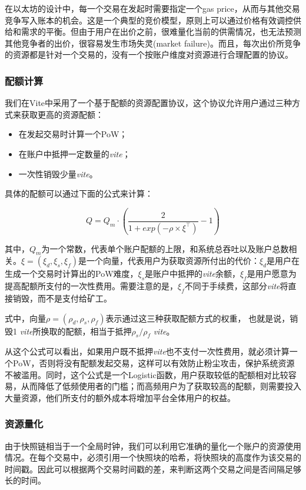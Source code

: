 \documentclass[UTF8,nofonts]{ctexart}
\begin{document}
\begin{multicols}{2}
在以太坊的设计中，每一个交易在发起时需要指定一个gas price，从而与其他交易竞争写入账本的机会。这是一个典型的竞价模型，原则上可以通过价格有效调控供给和需求的平衡。但由于用户在出价之前，很难量化当前的供需情况，也无法预测其他竞争者的出价，很容易发生市场失灵(market failure)。而且，每次出价所竞争的资源都是针对一个交易的，没有一个按账户维度对资源进行合理配置的协议。

\subsubsection{配额计算}
我们在Vite中采用了一个基于配额的资源配置协议，这个协议允许用户通过三种方式来获取更高的资源配额：
\begin{itemize}
\item 在发起交易时计算一个PoW；
\item 在账户中抵押一定数量的\textit{vite}；
\item 一次性销毁少量\textit{vite}。
\end{itemize}

具体的配额可以通过下面的公式来计算：

\begin{equation}
Q = Q_{m} \cdot \left ( \frac{2}{1+exp\left ( -\rho \times \xi^{\top} \right )} - 1  \right )
\end{equation}

其中，$Q_{m}$为一个常数，代表单个账户配额的上限，和系统总吞吐以及账户总数相关。$\xi=(\xi_{d}, \xi_{s}, \xi_{f})$是一个向量，代表用户为获取资源所付出的代价：$\xi_{d}$是用户在生成一个交易时计算出的PoW难度，$\xi_{s}$是账户中抵押的\textit{vite}余额，$\xi_{f}$是用户愿意为提高配额所支付的一次性费用。需要注意的是，$\xi_{f}$不同于手续费，这部分\textit{vite}将直接销毁，而不是支付给矿工。

式中，向量$\rho=(\rho_{d}, \rho_{s}, \rho_{f})$表示通过这三种获取配额方式的权重，
也就是说，销毁1 \: \textit{vite}所换取的配额，相当于抵押$\rho_{s} / \rho_{f}$ \: \textit{vite}。

从这个公式可以看出，如果用户既不抵押\textit{vite}也不支付一次性费用，就必须计算一个PoW，否则将没有配额发起交易，这样可以有效防止粉尘攻击，保护系统资源不被滥用。同时，这个公式是一个Logistic函数，用户获取较低的配额相对比较容易，从而降低了低频使用者的门槛；而高频用户为了获取较高的配额，则需要投入大量资源，他们所支付的额外成本将增加平台全体用户的权益。

\subsubsection{资源量化}
由于快照链相当于一个全局时钟，我们可以利用它准确的量化一个账户的资源使用情况。在每个交易中，必须引用一个快照块的哈希，将快照块的高度作为该交易的时间戳。因此可以根据两个交易时间戳的差，来判断这两个交易之间是否间隔足够长的时间。


\end{multicols}
\end{document}
